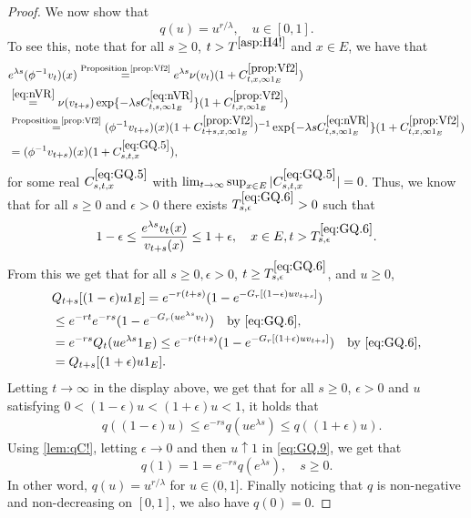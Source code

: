 \documentclass[12pt,a4paper]{amsart}
\numberwithin{equation}{section}
\theoremstyle{plain}
\theoremstyle{definition}
\theoremstyle{remark}
\begin{document}
\begin{proof}
	We now show that
\begin{equation} \label{eq:GQ}
	q(u) = u^{r/\lambda},\quad u\in [0,1].
\end{equation}
	To see this, note that for all $s\geq 0$, $t>T^{\eqref{asp:H4!}}$ and $x\in E$, we have that
	\begin{align}
	& e^{\lambda s}(\phi^{-1}v_t)(x)
	\overset{\text{Proposition \ref{prop:Vf2}}}= e^{\lambda s}\nu(v_{t})(1+ C^{\ref{prop:Vf2}}_{t,x,\infty 1_E})
	\\&\overset{\eqref{eq:nVR}}=\nu(v_{t+s}) \exp\{-\lambda sC^{\eqref{eq:nVR}}_{t,s,\infty 1_E}\} (1+ C^{\ref{prop:Vf2}}_{t,x,\infty 1_E})
	\\&\overset{\text{Proposition \ref{prop:Vf2}}}= (\phi^{-1}v_{t+s})(x) (1+ C^{\ref{prop:Vf2}}_{t+s,x,\infty 1_E})^{-1} \exp\{-\lambda sC^{\eqref{eq:nVR}}_{t,s,\infty 1_E}\} (1+ C^{\ref{prop:Vf2}}_{t,x,\infty 1_E})
	\\& \label{eq:GQ.5}= (\phi^{-1}v_{t+s})(x) (1+C_{s,t,x}^{\eqref{eq:GQ.5}}),
	\end{align}
	for some real $C_{s,t,x}^{\eqref{eq:GQ.5}}$ with $\lim_{t\to \infty}\sup_{x\in E} |C_{s,t,x}^{\eqref{eq:GQ.5}}| =0$.
	Thus, we know that for all $s\geq 0$ and $\epsilon >0$ there exists $T^{\eqref{eq:GQ.6}}_{s,\epsilon}>0$ such that
	\begin{equation} \label{eq:GQ.6}
	1-\epsilon
	\leq \frac{e^{\lambda s}v_t(x)}{v_{t+s}(x)}
	\leq 1+\epsilon,
	\quad x\in E, t> T^{\eqref{eq:GQ.6}}_{s,\epsilon}.
	\end{equation}
	From this we get that for all $s\geq 0, \epsilon > 0$, $t\ge T^{\eqref{eq:GQ.6}}_{s,\epsilon}$, and $u\geq 0$,
	\begin{align}
	& Q_{t+s}[ (1-\epsilon)u  1_E ]
	= e^{-r (t+s)}( 1-e^{-G_r[(1-\epsilon)uv_{t+s}]} )
	\\ & \leq e^{-r t} e^{-r s}( 1- e^{-G_r(ue^{\lambda s}v_t)} )\quad\text{by \eqref{eq:GQ.6}},
	\\%
&= e^{-r s}Q_t(ue^{\lambda s} 1_E)
	\leq e^{-r(t+s)}( 1-e^{-G_r[(1+\epsilon)uv_{t+s}]})\quad\text{by \eqref{eq:GQ.6}},
	\\\label{eq:GQ.8}&= Q_{t+s}[ (1+\epsilon)u 1_E ].
	\end{align}
	Letting $t\to \infty$ in the display above, we get that for all $s\geq 0$, $\epsilon > 0$ and $u$ satisfying $0 < (1 - \epsilon) u < (1+\epsilon)u < 1$, it holds that
\begin{align} \label{eq:GQ.9}
	& q((1-\epsilon)u)
	\leq e^{-r s}q(u e^{\lambda s})
	\leq q((1+\epsilon)u).
\end{align}
	Using \eqref{lem:qC!}, letting $\epsilon \to 0$ and then $u \uparrow 1$ in \eqref{eq:GQ.9}, we get that
\[
	q(1)
	=1
	= e^{- r s} q(e^{\lambda s}),
	\quad s \geq 0.
\]
	In other word, $q(u) = u^{r/\lambda}$ for $u\in (0,1]$.
	Finally noticing that $q$ is non-negative and non-decreasing on $[0,1]$, we also have $q(0) = 0$.


\end{proof}
\end{document}
